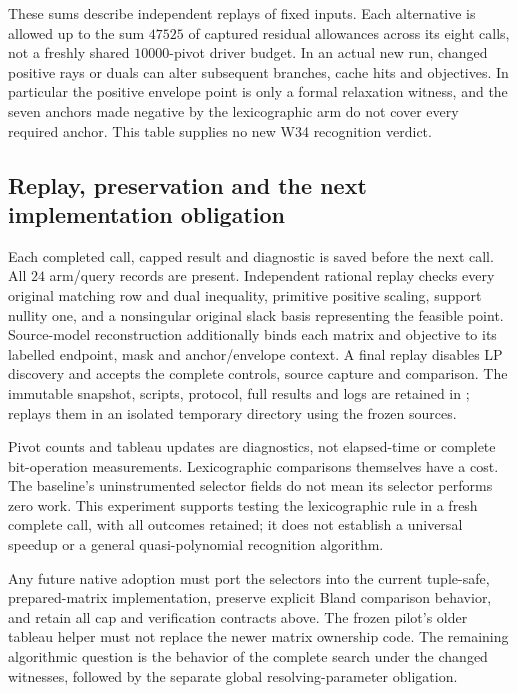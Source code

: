 These sums describe independent replays of fixed inputs.  Each alternative
is allowed up to the sum $47525$ of captured residual allowances across
its eight calls, not a freshly shared $10000$-pivot driver budget.  In an
actual new run, changed positive rays or duals can alter subsequent
branches, cache hits and objectives.  In particular the positive envelope
point is only a formal relaxation witness, and the seven anchors made
negative by the lexicographic arm do not cover every required anchor.
This table supplies no new
W34 recognition verdict.

\subsection{Replay, preservation and the next implementation obligation}

Each completed call, capped result and diagnostic is saved before the next
call.  All $24$ arm/query records are present.  Independent rational replay
checks every original matching row and dual inequality, primitive positive
scaling, support nullity one, and a nonsingular original slack basis
representing the feasible point.  Source-model reconstruction additionally
binds each matrix and objective to its labelled endpoint, mask and
anchor/envelope context.  A final replay disables LP discovery and accepts
the complete controls, source capture and comparison.  The immutable
snapshot, scripts, protocol, full results and logs are retained in
;
 replays them in an isolated temporary
directory using the frozen sources.

Pivot counts and tableau updates are diagnostics, not elapsed-time or
complete bit-operation measurements.  Lexicographic comparisons themselves
have a cost.  The baseline's uninstrumented selector fields do not mean
its selector performs zero work.  This experiment supports testing the
lexicographic rule in a fresh complete call, with all outcomes retained;
it does not establish a universal speedup or a general quasi-polynomial
recognition algorithm.

Any future native adoption must port the selectors into the current
tuple-safe, prepared-matrix implementation, preserve explicit Bland
comparison behavior, and retain all cap and verification contracts above.
The frozen pilot's older tableau helper must not replace the newer matrix
ownership code.  The remaining algorithmic question is the behavior of
the complete search under the changed witnesses, followed by the separate
global resolving-parameter obligation.
